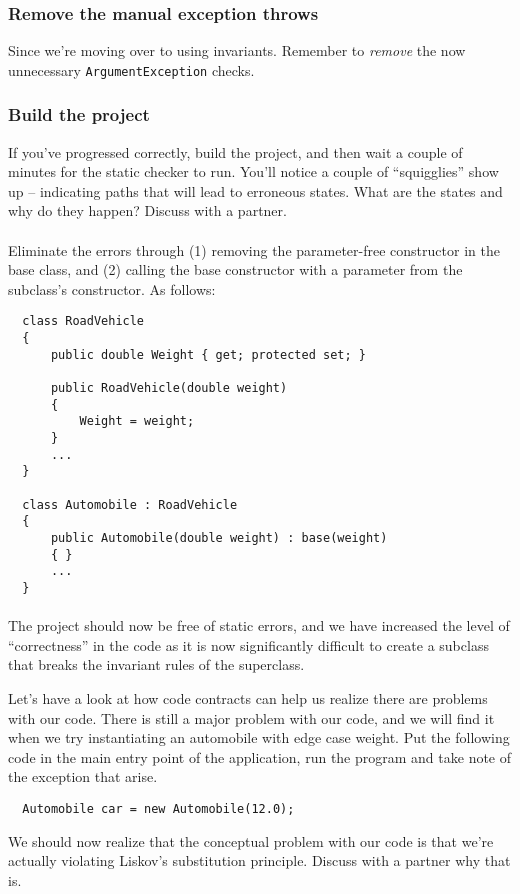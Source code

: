 \documentclass{article}
\begin{document}
    \subsubsection{Remove the manual exception throws}
      Since we're moving over to using invariants. Remember to \emph{remove} the now unnecessary \texttt{ArgumentException} checks.

    \subsubsection{Build the project}
      If you've progressed correctly, build the project, and then wait a couple of minutes for the static checker to run. You'll notice a couple of ``squigglies'' show up -- indicating paths that will lead to erroneous states. What are the states and why do they happen? Discuss with a partner.

      \paragraph{}
      Eliminate the errors through (1) removing the parameter-free constructor in the base class, and (2) calling the base constructor with a parameter from the subclass's constructor. As follows:

      \begin{lstlisting}
  class RoadVehicle
  {
      public double Weight { get; protected set; }

      public RoadVehicle(double weight)
      {
          Weight = weight;
      }
      ...
  }

  class Automobile : RoadVehicle
  {
      public Automobile(double weight) : base(weight) 
      { }
      ...
  }
      \end{lstlisting}

      \paragraph{}
      The project should now be free of static errors, and we have increased the level of ``correctness'' in the code as it is now significantly difficult to create a subclass that breaks the invariant rules of the superclass.

      Let's have a look at how code contracts can help us realize there are problems with our code. There is still a major problem with our code, and we will find it when we try instantiating an automobile with edge case weight. Put the following code in the main entry point of the application, run the program and take note of the exception that arise.
      \begin{lstlisting}
  Automobile car = new Automobile(12.0);
      \end{lstlisting}
      We should now realize that the conceptual problem with our code is that we're actually violating Liskov's substitution principle. Discuss with a partner why that is.
\end{document}
